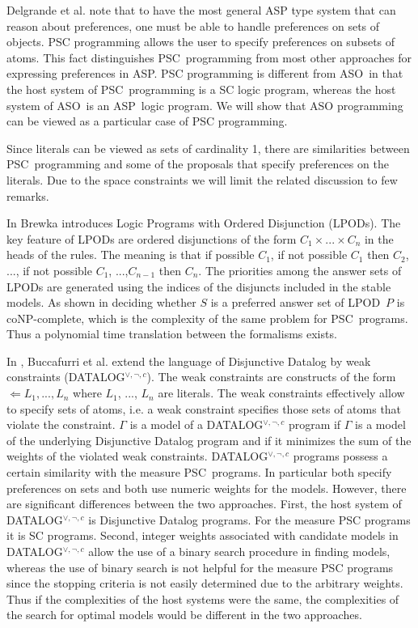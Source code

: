 \documentclass[letterpaper]{article}\usepackage{aaai}
\begin{document}
Delgrande et al. note that to have the most general ASP type system that can
reason about preferences, one must be able to handle preferences on sets of
objects. PSC programming allows the user to specify preferences on subsets of
atoms. This fact distinguishes PSC\ programming from most other approaches for
expressing preferences in ASP. PSC programming is different from ASO\ in that
the host system of PSC\ programming is a SC logic program, whereas the host
system of ASO\ is an ASP\ logic program. We will show that ASO programming can
be viewed as a particular case of PSC programming.

Since literals can be viewed as sets of cardinality 1, there are similarities
between PSC\ programming and some of the proposals that specify preferences on
the literals. Due to the space constraints we will limit the related
discussion to few remarks.

In \cite{Brewka02} Brewka introduces Logic Programs with Ordered Disjunction
(LPODs). The key feature of LPODs are ordered disjunctions of the form
$C_{1}\times...\times C_{n}$ in the heads of the rules. The meaning is that if
possible $C_{1}$, if not possible $C_{1}$ then $C_{2}$, ..., if not possible
$C_{1}$, ...,$C_{n-1}$ then $C_{n}$. The priorities among the answer sets of
LPODs are generated using the indices of the disjuncts included in the stable
models. As shown in \cite{BrewkaNS04} deciding whether $S$ is a preferred
answer set of LPOD\ $P$ is coNP-complete, which is the complexity of the same
problem for PSC\ programs. Thus a polynomial time translation between the
formalisms exists.

In \cite{BuccafurriLR00}, Buccafurri et al. extend the language of Disjunctive
Datalog by weak constraints (DATALOG$^{\vee,\lnot,c}$). The weak constraints
are constructs of the form $\Leftarrow L_{1},...,L_{n}$ where $L_{1}$, ...,
$L_{n}$ are literals. The weak constraints effectively allow to specify sets
of atoms, i.e. a weak constraint specifies those sets of atoms that violate
the constraint. $\Gamma$ is a model of a DATALOG$^{\vee,\lnot,c}$ program if
$\Gamma$ is a model of the underlying Disjunctive Datalog program and if it
minimizes the sum of the weights of the violated weak constraints.
DATALOG$^{\vee,\lnot,c}$ programs possess a certain similarity with the
measure PSC\ programs. In particular both specify preferences on sets and both
use numeric weights for the models. However, there are significant differences
between the two approaches. First, the host system of DATALOG$^{\vee,\lnot,c}$
is Disjunctive Datalog programs. For the measure PSC programs it is SC
programs. Second, integer weights associated with candidate models in
DATALOG$^{\vee,\lnot,c}$ allow the use of a binary search procedure in finding
models, whereas the use of binary search is not helpful for the measure PSC
programs since the stopping criteria is not easily determined due to the
arbitrary weights. Thus if the complexities of the host systems were the same,
the complexities of the search for optimal models would be different in the
two approaches.
\end{document}

